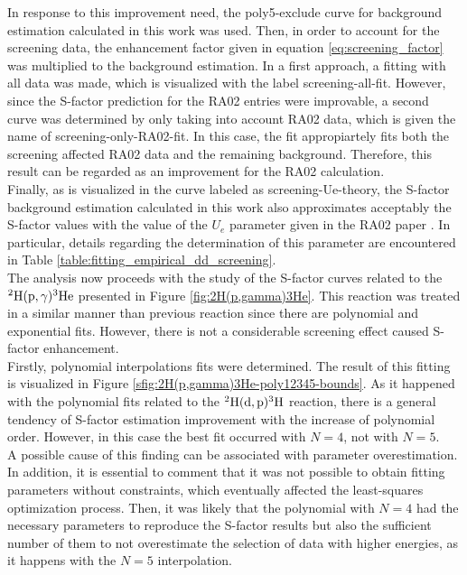 \documentclass[openany]{book}
\begin{document}
In response to this improvement need, the poly5-exclude curve for background estimation calculated in this work was used. Then, in order to account for the screening data, the enhancement factor given in equation \ref{eq:screening_factor} was multiplied to the background estimation. In a first approach, a fitting with all data was made, which is visualized with the label screening-all-fit. However, since the S-factor prediction for the RA02 entries were improvable, a second curve was determined by only taking into account RA02 data, which is given the name of screening-only-RA02-fit. In this case, the fit appropiartely fits both the screening affected RA02 data and the remaining  background. Therefore, this result can be regarded as an improvement for the RA02 calculation. \\

Finally, as is visualized in the curve labeled as screening-Ue-theory, the S-factor background estimation calculated in this work also approximates acceptably the S-factor values with the value of the $U_e$ parameter given in the RA02 paper \cite{raiola_migliardi_gyurky_aliotta_formicola_bonetti_broggini_campajola_corvisiero_costantini_et_2002}. In particular, details regarding the determination of this parameter are encountered in Table \ref{table:fitting_empirical_dd_screening}. \\

The analysis now proceeds with the study of the S-factor curves related to the $\mathrm{{}^{2}H(p, \gamma){}^{3}He}$ presented in Figure \ref{fig:2H(p,gamma)3He}. This reaction was treated in a similar manner than previous reaction since there are polynomial and exponential fits. However, there is not a considerable screening effect caused S-factor enhancement. \\

Firstly, polynomial interpolations fits were determined. The result of this fitting is visualized in Figure \ref{sfig:2H(p,gamma)3He-poly12345-bounds}. As it happened with the polynomial fits related to the $\mathrm{{}^{2}H(d, p){}^{3}H}$ reaction, there is a general tendency of S-factor estimation improvement with the increase of polynomial order. However, in this case the best fit occurred with $N = 4$, not with $N = 5$. \\

A possible cause of this finding can be associated with parameter overestimation. In addition, it is essential to comment that it was not possible to obtain fitting parameters without constraints, which eventually affected the least-squares optimization process. Then, it was likely that the polynomial with $N = 4$ had the necessary parameters to reproduce the S-factor results but also the sufficient number of them to not overestimate the selection of data with higher energies, as it happens with the $N = 5$ interpolation. \\
\end{document}
